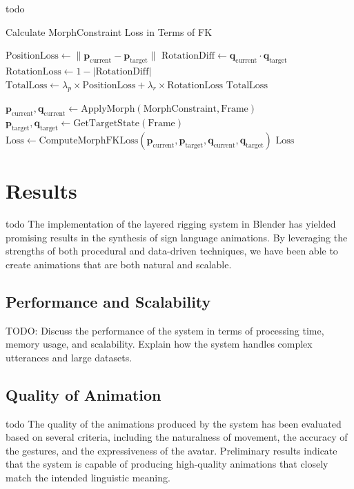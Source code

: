 \documentclass[../../main.tex]{subfiles}
\begin{document}
todo
\begin{algorithm}
    \caption{Calculate MorphConstraint Loss in Terms of FK}
    \begin{algorithmic}[1]
    
        \State $\text{PositionLoss} \gets \|\mathbf{p}_{\text{current}} - \mathbf{p}_{\text{target}}\|$
        \State $\text{RotationDiff} \gets \mathbf{q}_{\text{current}} \cdot \mathbf{q}_{\text{target}}$
        \State $\text{RotationLoss} \gets 1 - |\text{RotationDiff}|$
        \State $\text{TotalLoss} \gets \lambda_p \times \text{PositionLoss} + \lambda_r \times \text{RotationLoss}$
        \State \Return $\text{TotalLoss}$
    \EndProcedure
    
        \State $\mathbf{p}_{\text{current}}, \mathbf{q}_{\text{current}} \gets \text{ApplyMorph}(\text{MorphConstraint}, \text{Frame})$
        \State $\mathbf{p}_{\text{target}}, \mathbf{q}_{\text{target}} \gets \text{GetTargetState}(\text{Frame})$
        \State $\text{Loss} \gets \text{ComputeMorphFKLoss}(\mathbf{p}_{\text{current}}, \mathbf{p}_{\text{target}}, \mathbf{q}_{\text{current}}, \mathbf{q}_{\text{target}})$
        \State \Return $\text{Loss}$
    \EndProcedure
    
    \end{algorithmic}
\end{algorithm}

\section{Results}
todo The implementation of the layered rigging system in Blender has yielded promising results in the synthesis of sign language animations. By leveraging the strengths of both procedural and data-driven techniques, we have been able to create animations that are both natural and scalable.

\subsection{Performance and Scalability}
TODO: Discuss the performance of the system in terms of processing time, memory usage, and scalability. Explain how the system handles complex utterances and large datasets.

\subsection{Quality of Animation}
todo The quality of the animations produced by the system has been evaluated based on several criteria, including the naturalness of movement, the accuracy of the gestures, and the expressiveness of the avatar. Preliminary results indicate that the system is capable of producing high-quality animations that closely match the intended linguistic meaning.
\end{document}
